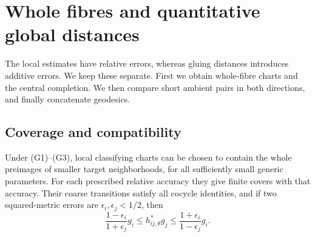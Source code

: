 \section{Whole fibres and quantitative global distances}\label{sec:global}

The local estimates have relative errors, whereas gluing distances
introduces additive errors. We keep these separate. First we obtain
whole-fibre charts and the central completion. We then compare short
ambient pairs in both directions, and finally concatenate geodesics.

\subsection{Coverage and compatibility}
\begin{proposition}\label{prop:coverage}
Under \textup{(G1)--(G3)}, local classifying charts can be chosen to
contain the whole preimages of smaller target neighborhoods, for
all sufficiently small generic parameters. For each prescribed
relative accuracy they give finite covers with that accuracy.
Their coarse transitions satisfy all cocycle identities, and if
two squared-metric errors are \(\epsilon_i,\epsilon_j<1/2\), then
\begin{equation}\label{eq:overlap-metric}
 \frac{1-\epsilon_i}{1+\epsilon_j}g_i
 \le h_{ij,\theta}^*g_j
 \le\frac{1+\epsilon_i}{1-\epsilon_j}g_i .
\end{equation}
\end{proposition}

